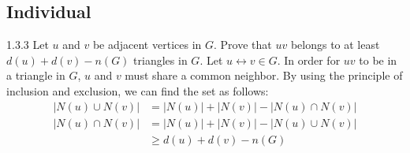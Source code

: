 \documentclass[9pt]{extarticle}
\begin{document}
\subsection*{Individual}%
  \begin{problem}{1.3.3}
    Let $u$ and $v$ be adjacent vertices in $G$. Prove that $uv$ belongs to at least $d(u) + d(v) - n(G)$ triangles in $G$.
  \tcblower
    Let $u\leftrightarrow v \in G$. In order for $uv$ to be in a triangle in $G$, $u$ and $v$ must share a common neighbor. By using the principle of inclusion and exclusion, we can find the set as follows:
    \begin{align*}
      |N(u) \cup N(v)| &= |N(u)| + |N(v)| - |N(u) \cap N(v)| \\
      |N(u) \cap N(v)| &= |N(u)| + |N(v)| - |N(u) \cup N(v)| \\
                       &\geq d(u) + d(v) - n(G)
    \end{align*}
  \end{problem}
\end{document}

